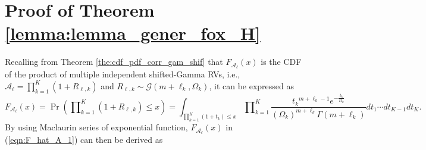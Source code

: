 \documentclass[12pt,onecolumn,draftcls]{IEEEtran}
\newcommand{\bs}{\boldsymbol}
\begin{document}
\section{Proof of Theorem \ref{lemma:lemma_gener_fox_H}}\label{app:lemma_gener_fox_H}
Recalling from Theorem \ref{the:cdf_pdf_corr_gam_shif} that ${F_{{{ {\mathcal A}}_{\bs{\ell}}}}}(x)$ is the CDF of the product of multiple independent shifted-Gamma RVs, i.e., $\mathcal A_{\bs{\ell}} = \prod\nolimits_{k = 1}^K (1+R_{{\bs{\ell}},k})$ and $R_{{\bs{\ell}},k} \sim \mathcal {G}(m+\ell_k,{\Omega _k})$, it can be expressed as
\begin{equation}\label{eqn:F_hat_A_1}
{F_{{{ {\mathcal A}}_{\bs{\ell}}}}}(x) = \Pr \left( {\prod\nolimits_{k = 1}^K {\left( {1 + {R_{{\bs{\ell}},k}}} \right)}  \le x} \right) %
=\int\nolimits_{\prod\nolimits_{k = 1}^K {\left( {1 + {t_k}} \right)}  \le x} {\prod\nolimits_{k = 1}^K {\frac{{{t_k}^{m + {\ell_k} - 1}{e^{ - \frac{{{t_k}}}{{{\Omega _k}}}}}}}{{{{\left( {{\Omega _k}} \right)}^{m + {\ell_k}}}\Gamma \left( {m + {\ell_k}} \right)}}} d{t_1} \cdots d{t_{K - 1}}d{t_K}}.
\end{equation}
By using Maclaurin series of exponential function, ${F_{{{ {\mathcal A}}_{\bs{\ell}}}}}(x)$ in (\ref{eqn:F_hat_A_1}) can then be derived as
\end{document}
